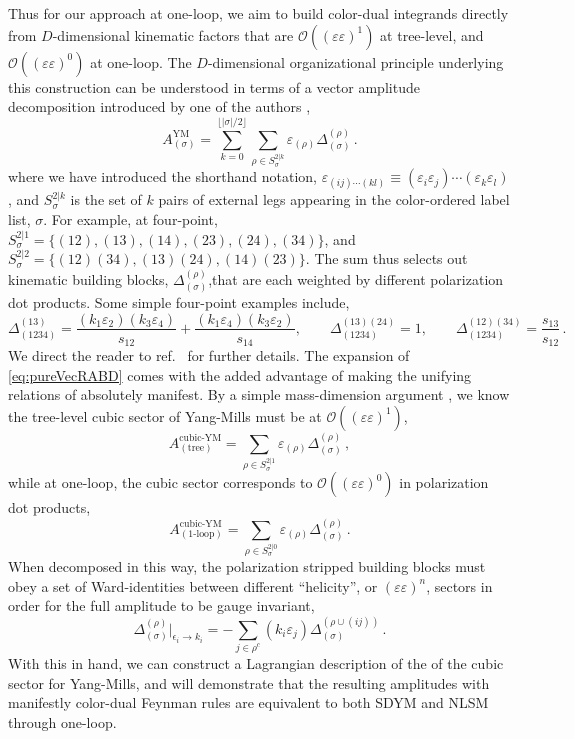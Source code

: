 \documentclass[11pt,letter]{article}
\def\be{\begin{equation}}
\def\ee{\end{equation}}
\begin{document}
Thus for our approach at one-loop, we aim to build color-dual integrands directly from $D$-dimensional kinematic factors that are $\mathcal{O}((\varepsilon\varepsilon)^1)$ at tree-level, and $\mathcal{O}((\varepsilon\varepsilon)^0)$ at one-loop. The $D$-dimensional organizational principle underlying this construction can be understood in terms of a vector amplitude decomposition introduced by one of the authors \cite{Pavao:2022kog},
\begin{equation}\label{eq:pureVecRABD}
A_{(\sigma)}^{\text{YM}} = \sum_{k=0}^{\lfloor |\sigma|/2\rfloor}\sum_{\rho \in S^{2|k}_{\sigma}}\varepsilon_{(\rho)} \Delta_{(\sigma)}^{(\rho)}\,.
\end{equation}
where we have introduced the shorthand notation, $\varepsilon_{(ij)\cdots (kl)} \equiv (\varepsilon_i \varepsilon_j)\cdots (\varepsilon_k \varepsilon_l)$, and  $S^{2|k}_{\sigma}$ is the set of $k$ pairs of external legs appearing in the color-ordered label list, $\sigma$. For example, at four-point, $S^{2|1}_{\sigma} =  \{(12),(13),(14),(23),(24),(34)\}$, and $S^{2|2}_{\sigma} =  \{(12)(34),(13)(24),(14)(23)\}$. The sum thus selects out kinematic building blocks, $\Delta_{(\sigma)}^{(\rho)}$,that are each weighted by different polarization dot products. Some simple four-point examples include, 
\be
\Delta^{(13)}_{(1234)} =\frac{(k_1 \varepsilon_2)(k_{3} \varepsilon_4)}{s_{12}}+\frac{(k_1 \varepsilon_4)(k_{3} \varepsilon_2)}{s_{14}}, \qquad \Delta^{(13)(24)}_{(1234)} =1, \qquad \Delta^{(12)(34)}_{(1234)} =\frac{s_{13}}{s_{12}}\,. 
\ee
We direct the reader to ref.~\cite{Pavao:2022kog} for further details. The expansion of \cref{eq:pureVecRABD} comes with the added advantage of making the unifying relations of \cite{Cheung:2017ems} absolutely manifest. By a simple mass-dimension argument \cite{ElvangHuangReview}, we know the tree-level cubic sector of Yang-Mills must be at
$\mathcal{O}((\varepsilon\varepsilon)^1)$,
\begin{equation}
A_{(\text{tree})}^{\text{cubic-YM}} = \sum_{\rho \in S^{2|1}_{\sigma}}\varepsilon_{(\rho)} \Delta_{(\sigma)}^{(\rho)}\, ,
\end{equation}
while at one-loop, the cubic sector corresponds to
$\mathcal{O}((\varepsilon\varepsilon)^0)$ in polarization dot
products,
\begin{equation}
A_{(\text{1-loop})}^{\text{cubic-YM}} = \sum_{\rho \in S^{2|0}_{\sigma}}\varepsilon_{(\rho)} \Delta_{(\sigma)}^{(\rho)}\,.
\end{equation}
When decomposed in this way, the polarization stripped building blocks
must obey a set of Ward-identities between different ``helicity'', or
$(\varepsilon \varepsilon)^n$, sectors in order for the full amplitude
to be gauge invariant,
 \begin{equation}\label{eq:GIrelA}
\Delta_{(\sigma)}^{(\rho)}\Big|_{\epsilon_i\rightarrow k_i} =-
\sum_{j \in \rho^c} (k_i \varepsilon_j)\Delta_{(\sigma )}^{(\rho\cup (ij))} \,.
\end{equation}
With this in hand, we can construct a Lagrangian description of the of
the cubic sector for Yang-Mills, and will demonstrate that the
resulting amplitudes with manifestly color-dual Feynman rules are
equivalent to both SDYM and NLSM through one-loop.
\end{document}

